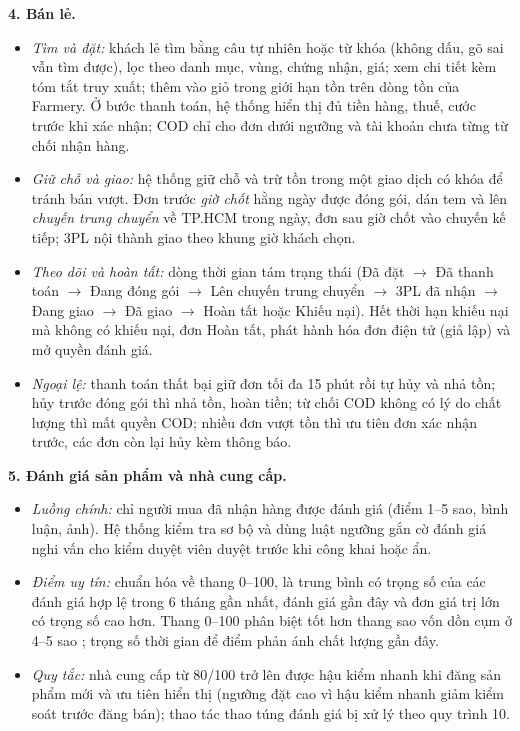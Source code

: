 \noindent\textbf{4. Bán lẻ.}
\begin{itemize}
    \item \emph{Tìm và đặt:} khách lẻ tìm bằng câu tự nhiên hoặc từ khóa (không dấu, gõ sai vẫn tìm được), lọc theo danh mục, vùng, chứng nhận, giá; xem chi tiết kèm tóm tắt truy xuất; thêm vào giỏ trong giới hạn tồn trên dòng tồn của Farmery. Ở bước thanh toán, hệ thống hiển thị đủ tiền hàng, thuế, cước trước khi xác nhận; COD chỉ cho đơn dưới ngưỡng và tài khoản chưa từng từ chối nhận hàng.
    \item \emph{Giữ chỗ và giao:} hệ thống giữ chỗ và trừ tồn trong một giao dịch có khóa để tránh bán vượt. Đơn trước \emph{giờ chốt} hằng ngày được đóng gói, dán tem và lên \emph{chuyến trung chuyển} về TP.HCM trong ngày, đơn sau giờ chốt vào chuyến kế tiếp; 3PL nội thành giao theo khung giờ khách chọn.
    \item \emph{Theo dõi và hoàn tất:} dòng thời gian tám trạng thái (Đã đặt $\rightarrow$ Đã thanh toán $\rightarrow$ Đang đóng gói $\rightarrow$ Lên chuyến trung chuyển $\rightarrow$ 3PL đã nhận $\rightarrow$ Đang giao $\rightarrow$ Đã giao $\rightarrow$ Hoàn tất hoặc Khiếu nại). Hết thời hạn khiếu nại mà không có khiếu nại, đơn Hoàn tất, phát hành hóa đơn điện tử (giả lập) và mở quyền đánh giá.
    \item \emph{Ngoại lệ:} thanh toán thất bại giữ đơn tối đa 15 phút rồi tự hủy và nhả tồn; hủy trước đóng gói thì nhả tồn, hoàn tiền; từ chối COD không có lý do chất lượng thì mất quyền COD; nhiều đơn vượt tồn thì ưu tiên đơn xác nhận trước, các đơn còn lại hủy kèm thông báo.
\end{itemize}

\noindent\textbf{5. Đánh giá sản phẩm và nhà cung cấp.}\label{subsec:danhgianghiepvu}
\begin{itemize}
    \item \emph{Luồng chính:} chỉ người mua đã nhận hàng được đánh giá (điểm 1--5 sao, bình luận, ảnh). Hệ thống kiểm tra sơ bộ và dùng luật ngưỡng gắn cờ đánh giá nghi vấn cho kiểm duyệt viên duyệt trước khi công khai hoặc ẩn.
    \item \emph{Điểm uy tín:} chuẩn hóa về thang 0--100, là trung bình có trọng số của các đánh giá hợp lệ trong 6 tháng gần nhất, đánh giá gần đây và đơn giá trị lớn có trọng số cao hơn. Thang 0--100 phân biệt tốt hơn thang sao vốn dồn cụm ở 4--5 sao \parencite{springer_article}; trọng số thời gian để điểm phản ánh chất lượng gần đây.
    \item \emph{Quy tắc:} nhà cung cấp từ 80/100 trở lên được hậu kiểm nhanh khi đăng sản phẩm mới và ưu tiên hiển thị (ngưỡng đặt cao vì hậu kiểm nhanh giảm kiểm soát trước đăng bán); thao tác thao túng đánh giá bị xử lý theo quy trình 10.
\end{itemize}

